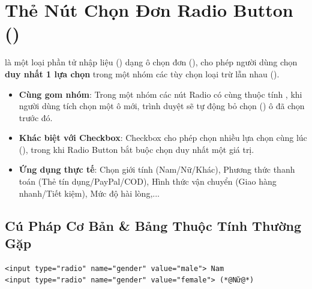 \section[Thẻ Nút Chọn Đơn Radio Button (\taghint{<input type="radio">})]{Thẻ Nút Chọn Đơn Radio Button ()}
\label{sec:html_radio_button}

\begin{conceptBox}
 là một loại phần tử nhập liệu () dạng ô chọn đơn (), cho phép người dùng chọn \textbf{duy nhất 1 lựa chọn} trong một nhóm các tùy chọn loại trừ lẫn nhau ().
\begin{itemize}[leftmargin=1.5em, itemsep=2pt, parsep=0pt]
    \item \textbf{Cùng  gom nhóm}: Trong một nhóm các nút Radio có cùng thuộc tính , khi người dùng tích chọn một ô mới, trình duyệt sẽ tự động bỏ chọn () ô đã chọn trước đó.
    \item \textbf{Khác biệt với Checkbox}: Checkbox cho phép chọn nhiều lựa chọn cùng lúc (), trong khi Radio Button bắt buộc chọn duy nhất một giá trị.
    \item \textbf{Ứng dụng thực tế}: Chọn giới tính (Nam/Nữ/Khác), Phương thức thanh toán (Thẻ tín dụng/PayPal/COD), Hình thức vận chuyển (Giao hàng nhanh/Tiết kiệm), Mức độ hài lòng,...
\end{itemize}
\end{conceptBox}

\subsection{Cú Pháp Cơ Bản \& Bảng Thuộc Tính Thường Gặp}

\begin{codeWindow}
\begin{lstlisting}[language=HTML5]
<input type="radio" name="gender" value="male"> Nam
<input type="radio" name="gender" value="female"> (*@Nữ@*)
\end{lstlisting}
\end{codeWindow}

